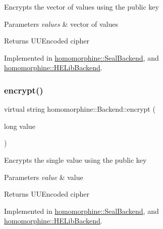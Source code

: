 Encrypts the vector of values using the public key


\begin{DoxyParams}{Parameters}
{\em values} & vector of values \\
\hline
\end{DoxyParams}
\begin{DoxyReturn}{Returns}
U\+U\+Encoded cipher 
\end{DoxyReturn}


Implemented in \mbox{\hyperlink{classhomomorphine_1_1_seal_backend_a0c9f992fb7626e55ad0bbfcc068e8e43}{homomorphine\+::\+Seal\+Backend}}, and \mbox{\hyperlink{classhomomorphine_1_1_h_e_lib_backend_af030a10bdd905f7cccf72c8eabfefdd7}{homomorphine\+::\+H\+E\+Lib\+Backend}}.

\mbox{\label{classhomomorphine_1_1_backend_a05ee154a7a5dd88a4a0589165fae9f97}} 
\subsubsection{\texorpdfstring{encrypt()}{encrypt()}\hspace{0.1cm}{\footnotesize\ttfamily [2/2]}}
{\footnotesize\ttfamily virtual string homomorphine\+::\+Backend\+::encrypt (\begin{DoxyParamCaption}\item[{long}]{value }\end{DoxyParamCaption})\hspace{0.3cm}{\ttfamily [pure virtual]}}

Encrypts the single value using the public key


\begin{DoxyParams}{Parameters}
{\em value} & value \\
\hline
\end{DoxyParams}
\begin{DoxyReturn}{Returns}
U\+U\+Encoded cipher 
\end{DoxyReturn}


Implemented in \mbox{\hyperlink{classhomomorphine_1_1_seal_backend_af64a70096e488a75aadbd934cf73d482}{homomorphine\+::\+Seal\+Backend}}, and \mbox{\hyperlink{classhomomorphine_1_1_h_e_lib_backend_a6a958824a123eab41b2099dbc001dc13}{homomorphine\+::\+H\+E\+Lib\+Backend}}.

\mbox{\label{classhomomorphine_1_1_backend_a88cd9469f1394a0a2d15c2f603280763}} 
